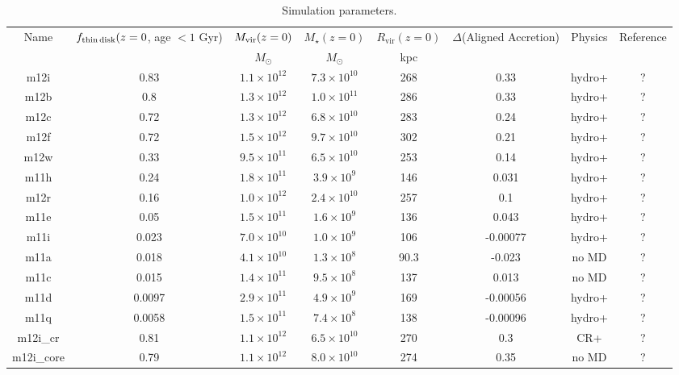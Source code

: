 \documentclass[fleqn,usenatbib]{mnras}
\begin{document}
\begin{table}
\caption{Simulation parameters.}
\begin{tabular}{cccccccc}
\hline
Name  &  $f_{\rm thin\,disk}(z=0$, age $<1$ Gyr)  &  $M_{\rm vir}(z=0)$  &  $M_\star(z=0)$  &  $R_{\textrm{vir}}(z=0)$  &  $\Delta$(Aligned Accretion)  &  Physics  &  Reference  \\
  &   &  $M_\odot$  & $M_\odot$  &  kpc  &  &  &  \\
 \hline
m12i  &  0.83  &  $1.1\times10^{12}$  &  $7.3\times10^{10}$  &  268  &  0.33  &  hydro+  &  ?    \\
m12b  &  0.8  &  $1.3\times10^{12}$  &  $1.0\times10^{11}$  &  286  &  0.33  &  hydro+  &  ?    \\
m12c  &  0.72  &  $1.3\times10^{12}$  &  $6.8\times10^{10}$  &  283  &  0.24  &  hydro+  &  ?    \\
m12f  &  0.72  &  $1.5\times10^{12}$  &  $9.7\times10^{10}$  &  302  &  0.21  &  hydro+  &  ?    \\
m12w  &  0.33  &  $9.5\times10^{11}$  &  $6.5\times10^{10}$  &  253  &  0.14  &  hydro+  &  ?    \\
m11h  &  0.24  &  $1.8\times10^{11}$  &  $3.9\times10^{9}$  &  146  &  0.031  &  hydro+  &  ?    \\
m12r  &  0.16  &  $1.0\times10^{12}$  &  $2.4\times10^{10}$  &  257  &  0.1  &  hydro+  &  ?    \\
m11e  &  0.05  &  $1.5\times10^{11}$  &  $1.6\times10^{9}$  &  136  &  0.043  &  hydro+  &  ?    \\
m11i  &  0.023  &  $7.0\times10^{10}$  &  $1.0\times10^{9}$  &  106  &  -0.00077  &  hydro+  &  ?    \\
m11a  &  0.018  &  $4.1\times10^{10}$  &  $1.3\times10^{8}$  &  90.3  &  -0.023  &  no MD  &  ?    \\
m11c  &  0.015  &  $1.4\times10^{11}$  &  $9.5\times10^{8}$  &  137  &  0.013  &  no MD  &  ?    \\
m11d  &  0.0097  &  $2.9\times10^{11}$  &  $4.9\times10^{9}$  &  169  &  -0.00056  &  hydro+  &  ?    \\
m11q  &  0.0058  &  $1.5\times10^{11}$  &  $7.4\times10^{8}$  &  138  &  -0.00096  &  hydro+  &  ?    \\
m12i\_cr  &  0.81  &  $1.1\times10^{12}$  &  $6.5\times10^{10}$  &  270  &  0.3  &  CR+  &  ?    \\
m12i\_core  &  0.79  &  $1.1\times10^{12}$  &  $8.0\times10^{10}$  &  274  &  0.35  &  no MD  &  ?    \\

\end{tabular}
\end{table}
\end{document}
